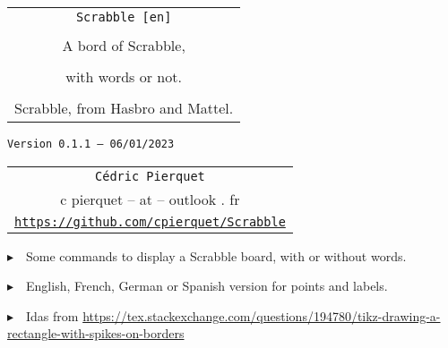 \documentclass{article}
\def\TPversion{0.1.1}
\def\TPdate{06/01/2023}
\begin{document}
\pagestyle{fancy}

\thispagestyle{empty}

\vspace{2cm}

\begin{center}
	\begin{minipage}{0.75\linewidth}
	\begin{tcolorbox}[colframe=yellow,colback=yellow!15]
		\begin{center}
			\begin{tabular}{c}
				{\Huge \texttt{Scrabble [en]}}\\
				\\
				{\LARGE A bord of Scrabble,} \\
				\\
				{\LARGE with words or not.} \\
				\\
				{Scrabble\texttrademark{}, from Hasbro\texttrademark{} and Mattel\texttrademark{}.}
			\end{tabular}
			
			\medskip
			
			{\small \texttt{Version \TPversion{} -- \TPdate}}
		\end{center}
	\end{tcolorbox}
\end{minipage}
\end{center}

\vspace{0.5cm}

\begin{center}
	\begin{tabular}{c}
	\texttt{Cédric Pierquet}\\
	{\ttfamily c pierquet -- at -- outlook . fr}\\
	\texttt{\url{https://github.com/cpierquet/Scrabble}}
\end{tabular}
\end{center}

\vspace{0.5cm}

{$\blacktriangleright$~~Some commands to display a Scrabble board, with or without words.}

\smallskip

{$\blacktriangleright$~~English, French, German or Spanish version for points and labels.}

\smallskip

{$\blacktriangleright$~~Idas from \url{https://tex.stackexchange.com/questions/194780/tikz-drawing-a-rectangle-with-spikes-on-borders}}
\end{document}

